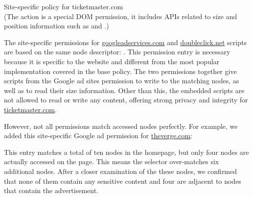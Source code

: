 \begin{algorithm}[bt]
	\setcounter{algorithm}{3}
  \caption{Site-specific policy for ticketmaster.com\\ {\footnotesize (The  action is a special DOM permission, it includes APIs related to size and position information such as  and .)}}
  \label{policy:ticketmaster}
  \begin{algorithmic}[1]
		\Statex \hspace{-5pt} \par
		\Statex \hspace{10pt} \par
		\Statex \hspace{10pt} %
\par
		\Statex \hspace{-5pt} \par
		\Statex \hspace{10pt} \par
  \end{algorithmic}
\end{algorithm}

The site-specific permissions for \url{googleadservices.com} and
\url{doubleclick.net} scripts are based on the same node descriptor:
.  This permission entry is
necessary because it is specific to the website and different from the most
popular implementation  covered in
the base policy.  The two permissions together give scripts from the
Google ad sites permission to write to the matching nodes, as well as to
read their size information.  Other than this, the embedded scripts are
not allowed to read or write any content, offering strong privacy and
integrity for \url{ticketmaster.com}.

However, not all permissions match accessed nodes perfectly.  For example,
we added this site-specific Google ad permission for \url{theverge.com}:

\begin{algorithmic}[1]
	\Statex {}\par
\end{algorithmic}
\noindent
This entry matches a total of ten nodes in the homepage, but only four nodes
are actually accessed on the page.  This means the selector over-matches
six additional nodes.  After a closer examination of the these nodes, we
confirmed that none of them contain any sensitive content and four are
adjacent to nodes that contain the advertisement.

